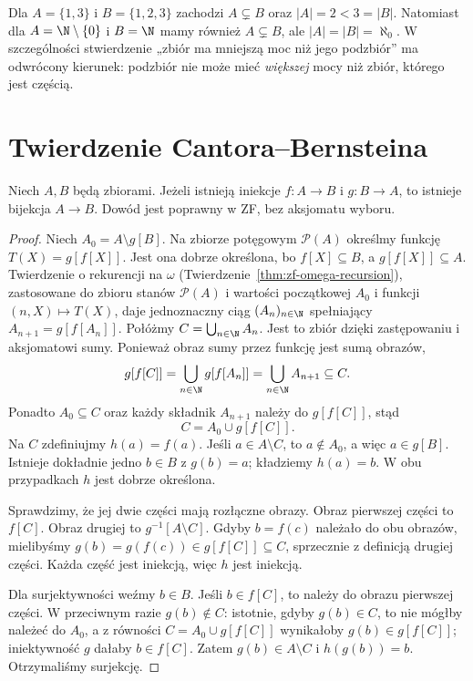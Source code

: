 \begin{przyklad}
Dla $A=\{1,3\}$ i $B=\{1,2,3\}$ zachodzi $A\subsetneq B$ oraz
$|A|=2<3=|B|$. Natomiast dla $A=\N\setminus\{0\}$ i $B=\N$
mamy również $A\subsetneq B$, ale $|A|=|B|=\aleph_0$.
W szczególności stwierdzenie „zbiór ma mniejszą moc niż jego podzbiór”
ma odwrócony kierunek: podzbiór nie może mieć \emph{większej}
mocy niż zbiór, którego jest częścią.
\end{przyklad}

\section{Twierdzenie Cantora--Bernsteina}
\begin{twierdzenie}\label{thm:card-cb}
Niech $A,B$ będą zbiorami. Jeżeli istnieją iniekcje $f:A\to B$ i $g:B\to A$, to istnieje bijekcja $A\to B$. Dowód jest poprawny w ZF, bez aksjomatu wyboru.
\end{twierdzenie}
\begin{proof}
Niech $A_0=A\setminus g[B]$. Na zbiorze potęgowym $\mathcal P(A)$
określmy funkcję $T(X)=g[f[X]]$. Jest ona dobrze określona, bo
$f[X]\subseteq B$, a $g[f[X]]\subseteq A$.
Twierdzenie o rekurencji na $\omega$
(Twierdzenie~\ref{thm:zf-omega-recursion}), zastosowane
do zbioru stanów $\mathcal P(A)$ i wartości początkowej $A_0$
i funkcji $(n,X)\mapsto T(X)$, daje jednoznaczny ciąg
$(A_n)_{n\in\N}$ spełniający $A_{n+1}=g[f[A_n]]$.
Połóżmy $C=\bigcup_{n\in\N}A_n$.
Jest to zbiór dzięki zastępowaniu i aksjomatowi sumy.
Ponieważ obraz sumy przez funkcję jest sumą obrazów,
\[
g[f[C]]=\bigcup_{n\in\N}g[f[A_n]]
=\bigcup_{n\in\N}A_{n+1}\subseteq C.
\]
Ponadto $A_0\subseteq C$ oraz każdy składnik
$A_{n+1}$ należy do $g[f[C]]$, stąd
\[
C=A_0\cup g[f[C]].
\]
Na $C$ zdefiniujmy $h(a)=f(a)$. Jeśli $a\in A\setminus C$, to $a\notin A_0$, a więc $a\in g[B]$. Istnieje dokładnie jedno $b\in B$ z $g(b)=a$; kładziemy $h(a)=b$. W obu przypadkach $h$ jest dobrze określona.

Sprawdzimy, że jej dwie części mają rozłączne obrazy. Obraz pierwszej części to $f[C]$. Obraz drugiej to $g^{-1}[A\setminus C]$. Gdyby $b=f(c)$ należało do obu obrazów, mielibyśmy $g(b)=g(f(c))\in g[f[C]]\subseteq C$, sprzecznie z definicją drugiej części. Każda część jest iniekcją, więc $h$ jest iniekcją.

Dla surjektywności weźmy $b\in B$. Jeśli $b\in f[C]$, to należy do obrazu pierwszej części. W przeciwnym razie $g(b)\notin C$: istotnie, gdyby $g(b)\in C$, to nie mógłby należeć do $A_0$, a z równości $C=A_0\cup g[f[C]]$ wynikałoby $g(b)\in g[f[C]]$; iniektywność $g$ dałaby $b\in f[C]$. Zatem $g(b)\in A\setminus C$ i $h(g(b))=b$. Otrzymaliśmy surjekcję.
\end{proof}
